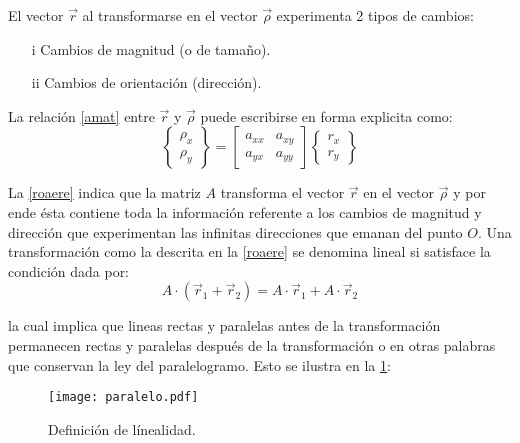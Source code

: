 \documentclass[../notas medios.tex]{subfiles}
\begin{document}
El vector $\vec{r}$ al transformarse en el vector $\vec{\rho}$ experimenta 2 tipos de cambios:
\begin{itemize}
\item[i] Cambios de magnitud (o de tamaño).
\item[ii] Cambios de orientación (dirección). 
\end{itemize}

La relación \cref{amat} entre $\vec{r}$ y $\vec{\rho}$ puede escribirse en forma explicita como:
\begin{equation}
\left\{ {\begin{array}{*{20}{c}}
{{\rho _x}}\\
{{\rho _y}}
\end{array}} \right\} = \left[ {\begin{array}{*{20}{c}}
{{a_{xx}}}&{{a_{xy}}}\\
{{a_{yx}}}&{{a_{yy}}}
\end{array}} \right]\left\{ {\begin{array}{*{20}{c}}
{{r_x}}\\
{{r_y}}
\end{array}} \right\}
\label{roaere}
\end{equation}

La \cref{roaere} indica que la matriz $A$ transforma el vector $\vec{r}$ en el vector $\vec{\rho}$ y por ende ésta contiene toda la información referente a los cambios de magnitud y dirección que experimentan las infinitas direcciones que emanan del punto $O$. Una transformación como la descrita en la \cref{roaere} se denomina lineal si satisface la condición dada por:
\begin{equation}
A \cdot \left( {{{\vec r}_1} + {{\vec r}_2}} \right) = A \cdot {{\vec r}_1} + A \cdot {{\vec r}_2}
\label{lineal}
\end{equation}

la cual implica que lineas rectas y paralelas antes de la transformación permanecen rectas y paralelas después de la transformación o en otras palabras que conservan la ley del paralelogramo. Esto se ilustra en la \cref{paralelo}:
\begin{figure}[H]
\centering
	\texttt{[image: paralelo.pdf]}
	\caption{Definición de línealidad.}
	\label{paralelo}
\end{figure}
\end{document}
